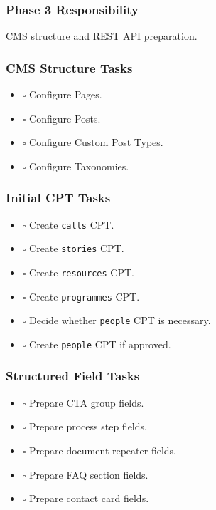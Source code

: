 \documentclass[12pt,a4paper]{article}
\providecommand{\tightlist}{\setlength{\itemsep}{0pt}\setlength{\parskip}{0pt}}
\begin{document}
\subsubsection{Phase 3 Responsibility}\label{phase-3-responsibility-4}

CMS structure and REST API preparation.

\subsubsection{CMS Structure Tasks}\label{cms-structure-tasks}

\begin{itemize}
\tightlist
\item
  \(\square\) Configure Pages.
\item
  \(\square\) Configure Posts.
\item
  \(\square\) Configure Custom Post Types.
\item
  \(\square\) Configure Taxonomies.
\end{itemize}

\subsubsection{Initial CPT Tasks}\label{initial-cpt-tasks}

\begin{itemize}
\tightlist
\item
  \(\square\) Create \texttt{calls} CPT.
\item
  \(\square\) Create \texttt{stories} CPT.
\item
  \(\square\) Create \texttt{resources} CPT.
\item
  \(\square\) Create \texttt{programmes} CPT.
\item
  \(\square\) Decide whether \texttt{people} CPT is necessary.
\item
  \(\square\) Create \texttt{people} CPT if approved.
\end{itemize}

\subsubsection{Structured Field Tasks}\label{structured-field-tasks}

\begin{itemize}
\tightlist
\item
  \(\square\) Prepare CTA group fields.
\item
  \(\square\) Prepare process step fields.
\item
  \(\square\) Prepare document repeater fields.
\item
  \(\square\) Prepare FAQ section fields.
\item
  \(\square\) Prepare contact card fields.
\end{itemize}
\end{document}

